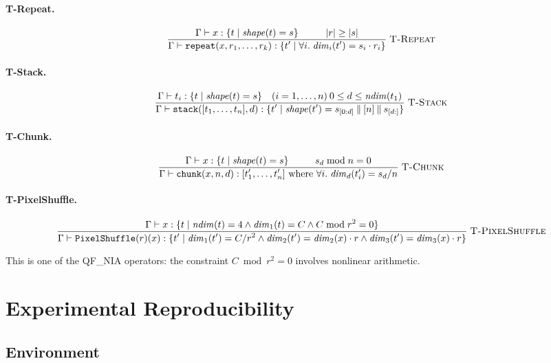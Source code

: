 \documentclass[10pt]{article}
\newcommand{\typerule}[3]{%
  \frac{\displaystyle #2}{\displaystyle #3}
  \;\textsc{#1}%
}
\theoremstyle{plain}
\theoremstyle{definition}
\theoremstyle{remark}
\begin{document}
\paragraph{T-Repeat.}
\[
\typerule{T-Repeat}{\Gamma \vdash x : \{t \mid \mathit{shape}(t) = s\}
   \\ |r| \geq |s|}{\Gamma \vdash \texttt{repeat}(x, r_1, \ldots, r_k) :
    \{t' \mid \forall i.\; \mathit{dim}_i(t') = s_i \cdot r_i\}}
\]

\paragraph{T-Stack.}
\[
\typerule{T-Stack}{\Gamma \vdash t_i : \{t \mid \mathit{shape}(t) = s\}
    \quad (i = 1, \ldots, n) \\
   0 \leq d \leq \mathit{ndim}(t_1)}{\Gamma \vdash \texttt{stack}([t_1, \ldots, t_n], d) :
    \{t' \mid \mathit{shape}(t') = s_{[0:d]} \mathbin\| [n] \mathbin\| s_{[d:]}\}}
\]

\paragraph{T-Chunk.}
\[
\typerule{T-Chunk}{\Gamma \vdash x : \{t \mid \mathit{shape}(t) = s\}
   \\ s_d \bmod n = 0}{\Gamma \vdash \texttt{chunk}(x, n, d) :
    [t'_1, \ldots, t'_n] \text{ where }
    \forall i.\; \mathit{dim}_d(t'_i) = s_d / n}
\]

\paragraph{T-PixelShuffle.}
\[
\typerule{T-PixelShuffle}{\Gamma \vdash x : \{t \mid \mathit{ndim}(t) = 4
    \land \mathit{dim}_1(t) = C \land C \bmod r^2 = 0\}}{\Gamma \vdash \texttt{PixelShuffle}(r)(x) :
    \{t' \mid \mathit{dim}_1(t') = C / r^2 \land
    \mathit{dim}_2(t') = \mathit{dim}_2(x) \cdot r \land
    \mathit{dim}_3(t') = \mathit{dim}_3(x) \cdot r\}}
\]

This is one of the QF\_NIA operators: the constraint $C \bmod r^2 = 0$
involves nonlinear arithmetic.


\section{Experimental Reproducibility}\label{app:reproduce}

\subsection{Environment}
\end{document}
